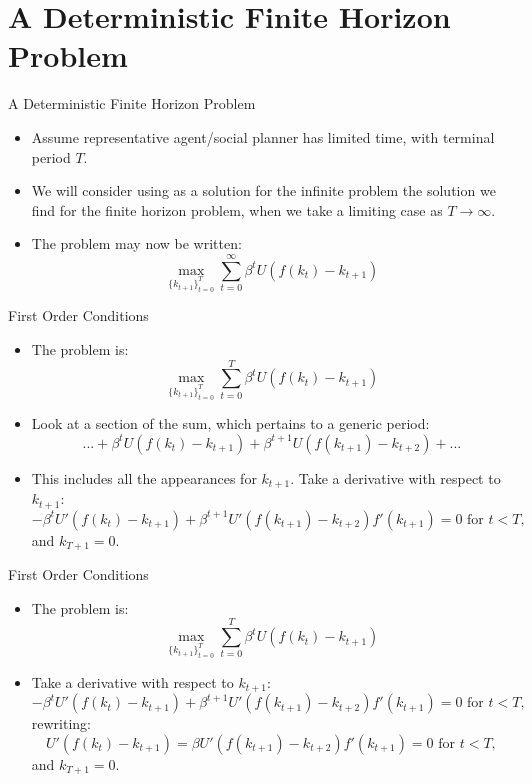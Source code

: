 \documentclass{beamer}
\begin{document}
\section{A Deterministic Finite Horizon Problem}
\begin{frame}{A Deterministic Finite Horizon Problem}
    \begin{itemize}
        \item Assume representative agent/social planner has limited time, with terminal period $T$. 
        \item We will consider using as a solution for the infinite problem the solution we find for the finite horizon problem, when we take a limiting case as $T\to \infty$.
        \item The problem may now be written:
        \[\max_{\{ k_{t+1}\}_{t=0}^T} \sum_{t=0}^\infty \beta^t U\left(f(k_t)-k_{t+1}\right)
    \]
        
    \end{itemize}
\end{frame}
\begin{frame}{First Order Conditions}
    \begin{itemize}
       
        \item The problem is:
        \[\max_{\{ k_{t+1}\}_{t=0}^T} \sum_{t=0}^T \beta^t U\left(f(k_t)-k_{t+1}\right)
    \]
    \item Look at a section of the sum, which pertains to a generic period: 
    \[... +  \beta^t U\left(f(k_t)-k_{t+1}\right)+ \beta^{t+1} U\left(f(k_{t+1})-k_{t+2}\right)+...
    \]
        \item This includes all the appearances for $k_{t+1}$. Take a derivative with respect to $k_{t+1}$:
        \[ - \beta^t U'\left(f(k_t)-k_{t+1}\right)+ \beta^{t+1} U'\left(f(k_{t+1})-k_{t+2}\right)f'(k_{t+1})=0 \text{ for } t<T, 
        \]
        and $k_{T+1}=0$.
    \end{itemize}
\end{frame}
\begin{frame}{First Order Conditions}
    \begin{itemize}
       
        \item The problem is:
        \[\max_{\{ k_{t+1}\}_{t=0}^T} \sum_{t=0}^T \beta^t U\left(f(k_t)-k_{t+1}\right)
    \]
 
        \item  Take a derivative with respect to $k_{t+1}$:
        \[ - \beta^t U'\left(f(k_t)-k_{t+1}\right)+ \beta^{t+1} U'\left(f(k_{t+1})-k_{t+2}\right)f'(k_{t+1})=0 \text{ for } t<T, 
        \]
        rewriting:
        \[  U'\left(f(k_t)-k_{t+1}\right)= \beta U'\left(f(k_{t+1})-k_{t+2}\right)f'(k_{t+1})=0 \text{ for } t<T, 
        \]
         and $k_{T+1}=0$.
    \end{itemize}
\end{frame}
\end{document}
